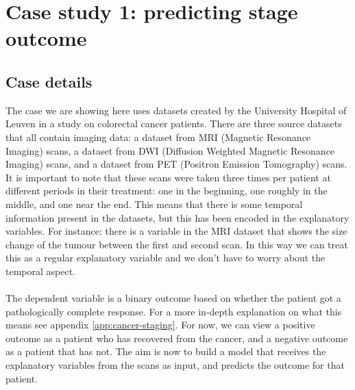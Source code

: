 \section{Case study 1: predicting stage outcome}
\label{sec:evaluation-predictingstage}
\subsection{Case details}
\label{sec:evaluation-casedetails}
The case we are showing here uses datasets created by the University Hospital of Leuven in a study on colorectal cancer patients. There are three source datasets that all contain imaging data: a dataset from MRI (Magnetic Resonance Imaging) scans, a dataset from DWI (Diffusion Weighted Magnetic Resonance Imaging) scans, and a dataset from PET (Positron Emission Tomography) scans. It is important to note that these scans were taken three times per patient at different periods in their treatment: one in the beginning, one roughly in the middle, and one near the end. This means that there is some temporal information present in the datasets, but this has been encoded in the explanatory variables. For instance: there is a variable in the MRI dataset that shows the size change of the tumour between the first and second scan. In this way we can treat this as a regular explanatory variable and we don't have to worry about the temporal aspect. \\ \\
The dependent variable is a binary outcome based on whether the patient got a pathologically complete response. For a more in-depth explanation on what this means see appendix \ref{app:cancer-staging}. For now, we can view a positive outcome as a patient who has recovered from the cancer, and a negative outcome as a patient that has not. The aim is now to build a model that receives the explanatory variables from the scans as input, and predicts the outcome for that patient.
